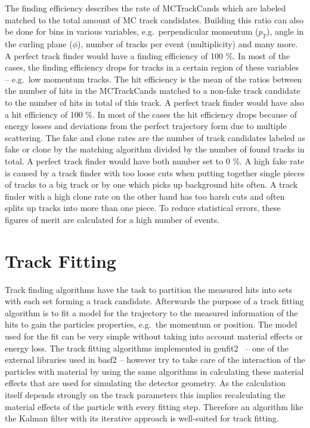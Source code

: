 The finding efficiency describes the rate of MCTrackCands which are labeled matched to the total amount of MC track candidates. Building this ratio can also be done for bins in various variables, e.g.\ perpendicular momentum ($p_T$), angle in the curling plane ($\phi$), number of tracks per event (multiplicity) and many more. A perfect track finder would have a finding efficiency of 100 \%. In most of the cases, the finding efficiency drops for tracks in a certain region of these variables -- e.g.\ low momentum tracks.
The hit efficiency is the mean of the ratios between the number of hits in the MCTrackCands matched to a non-fake track candidate to the number of hits in total of this track. A perfect track finder would have also a hit efficiency of 100 \%. In most of the cases the hit efficiency drops because of energy losses and deviations from the perfect trajectory form due to multiple scattering.
The fake and clone rates are the number of track candidates labeled as fake or clone by the matching algorithm divided by the number of found tracks in total. A perfect track finder would have both number set to 0 \%. A high fake rate is caused by a track finder with too loose cuts when putting together single pieces of tracks to a big track or by one which picks up background hits often. A track finder with a high clone rate on the other hand has too harsh cuts and often splits up tracks into more than one piece. To reduce statistical errors, these figures of merit are calculated for a high number of events.

\section{Track Fitting} \label{section-fitting}

Track finding algorithms have the task to partition the measured hits into sets with each set forming a track candidate. Afterwards the purpose of a track fitting algorithm is to fit a model for the trajectory to the measured information of the hits to gain the particles properties, e.g.\ the momentum or position. The model used for the fit can be very simple without taking into account material effects or energy loss. The track fitting algorithms implemented in genfit2~\cite{genfit} -- one of the external libraries used in basf2 -- however try to take care of the interaction of the particles with material by using the same algorithms in calculating these material effects that are used for simulating the detector geometry. As the calculation itself depends strongly on the track parameters this implies recalculating the material effects of the particle with every fitting step. Therefore an algorithm like the Kalman filter with its iterative approach is well-suited for track fitting.

